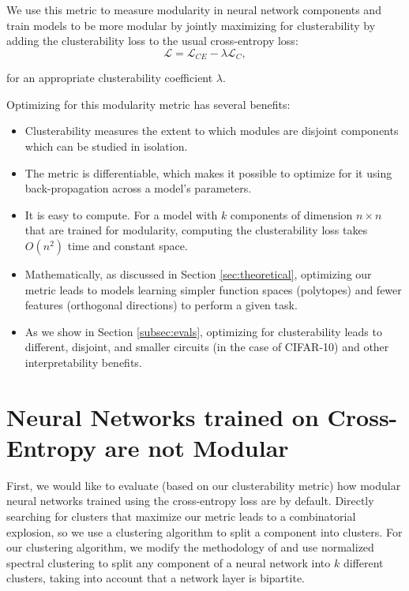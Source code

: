 
We use this metric to measure modularity in neural network components and train models to be more modular by jointly maximizing for clusterability by adding the clusterability loss to the usual cross-entropy loss:
\[\mathcal{L} = \mathcal{L}_{CE} - \lambda \mathcal{L}_C,\]

for an appropriate clusterability coefficient $\lambda$.

Optimizing for this modularity metric has several benefits:


\begin{itemize}
    \item Clusterability measures the extent to which modules are disjoint components which can be studied in isolation.
    \item The metric is differentiable, which makes it possible to optimize for it using back-propagation across a model's parameters.
    \item It is easy to compute. For a model with $k$ components of dimension $n \times n$ that are trained for modularity, computing the clusterability loss takes $O(n^2)$ time and constant space.
    \item Mathematically, as discussed in Section \ref{sec:theoretical}, optimizing our metric leads to models learning simpler function spaces (polytopes) and fewer features (orthogonal directions) to perform a given task.
    \item As we show in Section \ref{subsec:evals}, optimizing for clusterability leads to different, disjoint, and smaller circuits (in the case of CIFAR-10) and other interpretability benefits.
\end{itemize}

\section{Neural Networks trained on Cross-Entropy are not Modular}
\label{sec:spectral-clustering}

First, we would like to evaluate (based on our clusterability metric) how modular neural networks trained using the cross-entropy loss are by default. Directly searching for clusters that maximize our metric leads to a combinatorial explosion, so we use a clustering algorithm to split a component into clusters. For our clustering algorithm, we modify the methodology of \citet{filan2021clusterability} and use normalized spectral clustering to split any component of a neural network into $k$ different clusters, taking into account that a network layer is bipartite.


